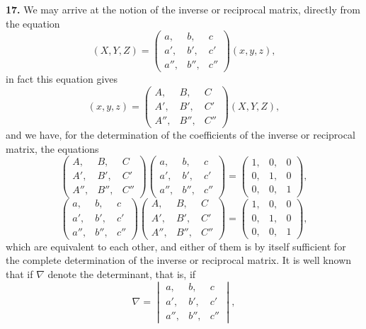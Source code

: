 \documentclass[12pt,a4paper]{article}
\theoremstyle{definition}
\begin{document}
\medskip
\noindent\textbf{17.} We may arrive at the notion of the inverse or reciprocal matrix, directly from the equation
\[
(X,Y,Z) = \begin{pmatrix} a, & b, & c \\ a', & b', & c' \\ a'', & b'', & c'' \end{pmatrix}(x,y,z),
\]
in fact this equation gives
\[
(x,y,z) = \begin{pmatrix} A, & B, & C \\ A', & B', & C' \\ A'', & B'', & C'' \end{pmatrix}(X,Y,Z),
\]
and we have, for the determination of the coefficients of the inverse or reciprocal matrix, the equations
\[
\begin{pmatrix} A, & B, & C \\ A', & B', & C' \\ A'', & B'', & C'' \end{pmatrix}
\begin{pmatrix} a, & b, & c \\ a', & b', & c' \\ a'', & b'', & c'' \end{pmatrix}
=
\begin{pmatrix} 1, & 0, & 0 \\ 0, & 1, & 0 \\ 0, & 0, & 1 \end{pmatrix},
\]
\[
\begin{pmatrix} a, & b, & c \\ a', & b', & c' \\ a'', & b'', & c'' \end{pmatrix}
\begin{pmatrix} A, & B, & C \\ A', & B', & C' \\ A'', & B'', & C'' \end{pmatrix}
=
\begin{pmatrix} 1, & 0, & 0 \\ 0, & 1, & 0 \\ 0, & 0, & 1 \end{pmatrix},
\]
which are equivalent to each other, and either of them is by itself sufficient for the complete determination of the inverse or reciprocal matrix. It is well known that if $\nabla$ denote the determinant, that is, if
\[
\nabla = \begin{vmatrix} a, & b, & c \\ a', & b', & c' \\ a'', & b'', & c'' \end{vmatrix},
\]
\end{document}
